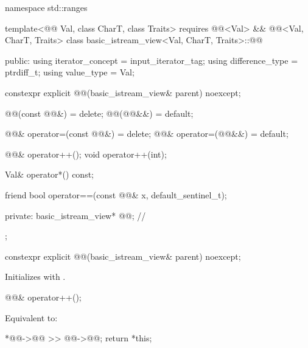 %
\begin{codeblock}
namespace std::ranges {
  template<@@ Val, class CharT, class Traits>
    requires @@<Val> &&
             @@<Val, CharT, Traits>
  class basic_istream_view<Val, CharT, Traits>::@@ {
  public:
    using iterator_concept = input_iterator_tag;
    using difference_type = ptrdiff_t;
    using value_type = Val;

    constexpr explicit @@(basic_istream_view& parent) noexcept;

    @@(const @@&) = delete;
    @@(@@&&) = default;

    @@& operator=(const @@&) = delete;
    @@& operator=(@@&&) = default;

    @@& operator++();
    void operator++(int);

    Val& operator*() const;

    friend bool operator==(const @@& x, default_sentinel_t);

  private:
    basic_istream_view* @@;                                // \expos
  };
}
\end{codeblock}

%
\begin{itemdecl}
constexpr explicit @@(basic_istream_view& parent) noexcept;
\end{itemdecl}

\begin{itemdescr}
\pnum
\effects
Initializes  with .
\end{itemdescr}

%
\begin{itemdecl}
@@& operator++();
\end{itemdecl}

\begin{itemdescr}
\pnum
\effects
Equivalent to:
\begin{codeblock}
*@@->@@ >> @@->@@;
return *this;
\end{codeblock}
\end{itemdescr}

